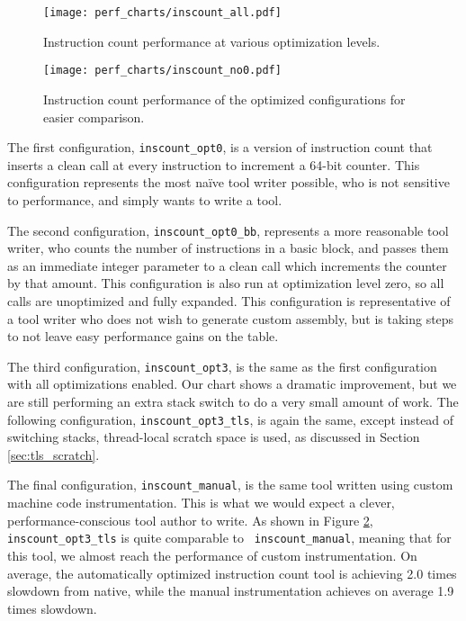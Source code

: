 \begin{figure}
\texttt{[image: perf\_charts/inscount\_all.pdf]}
\caption{Instruction count performance at various optimization levels.}
\label{fig:inscount_all}
\end{figure}

\begin{figure}
\texttt{[image: perf\_charts/inscount\_no0.pdf]}
\caption{Instruction count performance of the optimized configurations for
easier comparison.}
\label{fig:inscount_no0}
\end{figure}

The first configuration, {\tt inscount\_opt0}, is a version of instruction count
that inserts a clean call at every instruction to increment a 64-bit counter.
This configuration represents the most na\"ive tool writer possible, who is not
sensitive to performance, and simply wants to write a tool.

The second configuration, {\tt inscount\_opt0\_bb}, represents a more reasonable
tool writer, who counts the number of instructions in a basic block, and passes
them as an immediate integer parameter to a clean call which increments the
counter by that amount.  This configuration is also run at optimization level
zero, so all calls are unoptimized and fully expanded.  This configuration is
representative of a tool writer who does not wish to generate custom assembly,
but is taking steps to not leave easy performance gains on the table.

The third configuration, {\tt inscount\_opt3}, is the same as the first
configuration with all optimizations enabled.  Our chart shows a dramatic
improvement, but we are still performing an extra stack switch to do a very
small amount of work.  The following configuration, {\tt inscount\_opt3\_tls},
is again the same, except instead of switching stacks, thread-local scratch
space is used, as discussed in Section \ref{sec:tls_scratch}.

The final configuration, {\tt inscount\_manual}, is the same tool written using
custom machine code instrumentation.  This is what we would expect a clever,
performance-conscious tool author to write.  As shown in Figure
\ref{fig:inscount_no0}, {\tt inscount\_opt3\_tls} is quite comparable to {\tt
inscount\_manual}, meaning that for this tool, we almost reach the performance
of custom instrumentation.  On average, the automatically optimized instruction
count tool is achieving 2.0 times slowdown from native, while the manual
instrumentation achieves on average 1.9 times slowdown.

